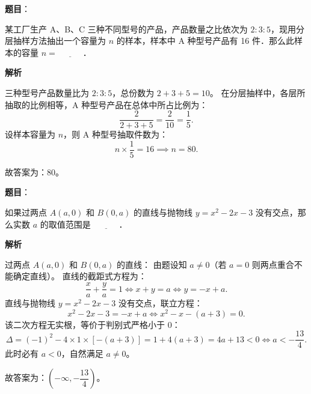 \begin{answer}

\textbf{题目}：

某工厂生产 A、B、C 三种不同型号的产品，产品数量之比依次为 $2 : 3 : 5$，现用分层抽样方法抽出一个容量为 $n$ 的样本，样本中 A 种型号产品有 16 件．那么此样本的容量 $n = \underline{\hspace{3em}}$．

\textbf{解析}

三种型号产品数量比为 $2 : 3 : 5$，总份数为 $2 + 3 + 5 = 10$。
在分层抽样中，各层所抽取的比例相等，A 种型号产品在总体中所占比例为：
\nopagebreak[4]
\[
\dfrac{2}{2 + 3 + 5} = \dfrac{2}{10} = \dfrac{1}{5}.
\]
设样本容量为 $n$，则 A 种型号抽取件数为：
\nopagebreak[4]
\[
n \times \dfrac{1}{5} = 16 \implies n = 80.
\]

故答案为：80。


\end{answer}
\begin{answer}

\textbf{题目}：

如果过两点 $A(a, 0)$ 和 $B(0, a)$ 的直线与抛物线 $y = x^2 - 2x - 3$ 没有交点，那么实数 $a$ 的取值范围是 $\underline{\hspace{3em}}$．

\textbf{解析}

过两点 $A(a, 0)$ 和 $B(0, a)$ 的直线：
由题设知 $a \neq 0$（若 $a = 0$ 则两点重合不能确定直线）。
直线的截距式方程为：
\nopagebreak[4]
\[
\dfrac{x}{a} + \dfrac{y}{a} = 1 \iff x + y = a \iff y = -x + a.
\]
直线与抛物线 $y = x^2 - 2x - 3$ 没有交点，联立方程：
\nopagebreak[4]
\[
x^2 - 2x - 3 = -x + a \iff x^2 - x - (a + 3) = 0.
\]
该二次方程无实根，等价于判别式严格小于 0：
\nopagebreak[4]
\[
\Delta = (-1)^2 - 4 \times 1 \times [-(a + 3)] = 1 + 4(a + 3) = 4a + 13 < 0 \iff a < -\dfrac{13}{4}.
\]
此时必有 $a < 0$，自然满足 $a \neq 0$。

故答案为：$\left(-\infty, -\dfrac{13}{4}\right)$。


\end{answer}
